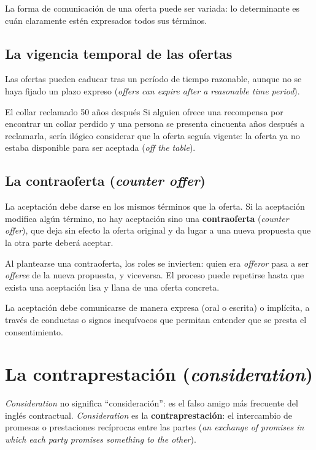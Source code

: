 \documentclass[12pt,oneside]{book}
\begin{document}
La forma de comunicación de una oferta puede ser variada: lo determinante es cuán claramente estén expresados todos sus términos.

\subsection{La vigencia temporal de las ofertas}

Las ofertas pueden caducar tras un período de tiempo razonable, aunque no se haya fijado un plazo expreso (\textit{offers can expire after a reasonable time period}).

\begin{example}{El collar reclamado 50 años después}
Si alguien ofrece una recompensa por encontrar un collar perdido y una persona se presenta cincuenta años después a reclamarla, sería ilógico considerar que la oferta seguía vigente: la oferta ya no estaba disponible para ser aceptada (\textit{off the table}).
\end{example}

\subsection{La contraoferta (\textit{counter offer})}

La aceptación debe darse en los mismos términos que la oferta. Si la aceptación modifica algún término, no hay aceptación sino una \textbf{contraoferta} (\textit{counter offer}), que deja sin efecto la oferta original y da lugar a una nueva propuesta que la otra parte deberá aceptar.

Al plantearse una contraoferta, los roles se invierten: quien era \textit{offeror} pasa a ser \textit{offeree} de la nueva propuesta, y viceversa. El proceso puede repetirse hasta que exista una aceptación lisa y llana de una oferta concreta.

La aceptación debe comunicarse de manera expresa (oral o escrita) o implícita, a través de conductas o signos inequívocos que permitan entender que se presta el consentimiento.

\section{La contraprestación (\textit{consideration})}

\begin{important}
\textit{Consideration} no significa ``consideración'': es el falso amigo más frecuente del inglés contractual. \textit{Consideration} es la \textbf{contraprestación}: el intercambio de promesas o prestaciones recíprocas entre las partes (\textit{an exchange of promises in which each party promises something to the other}).
\end{important}
\end{document}

